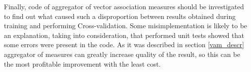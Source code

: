 Finally, code of aggregator of vector association measures should be investigated to find out what caused such a disproportion between results
obtained during training and performing Cross-validation. Some misimplementation is likely to be an explanation, taking into consideration, 
that performed unit tests showed that some errors were present in the code. As it was described in section \ref{vam_descr} aggregator of measures 
can greatly increase quality of the result, so this can be the most profitable improvement with the least cost.





